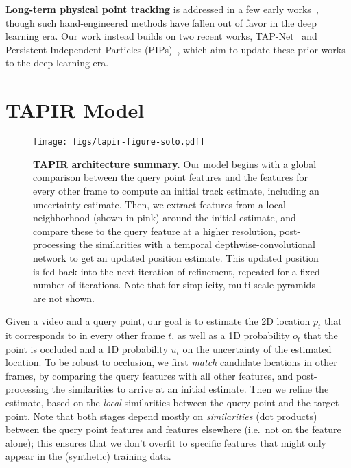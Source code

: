 \documentclass[10pt,twocolumn,letterpaper]{article}
\begin{document}
\noindent \textbf{Long-term physical point tracking} is addressed in a few early works~\cite{wang2013action,sand2008particle,liu2010sift,Rubinstein2012,Sivic2006}, though such hand-engineered methods have fallen out of favor in the deep learning era. 
Our work instead builds on two recent works, TAP-Net~\cite{doersch2022tap} and Persistent Independent Particles (PIPs)~\cite{harley2022particle}, which aim to update these prior works to the deep learning era.

\section{TAPIR Model}

\begin{figure}[t]
\begin{center}
\texttt{[image: figs/tapir-figure-solo.pdf]}
\end{center}
   \caption{\textbf{TAPIR architecture summary.}  Our model begins with a global comparison between the query point features and the features for every other frame to compute an initial track estimate, including an uncertainty estimate.  Then, we extract features from a local neighborhood (shown in pink) around the initial estimate, and compare these to the query feature at a higher resolution, post-processing the similarities with a temporal depthwise-convolutional network to get an updated position estimate.  This updated position is fed back into the next iteration of refinement, repeated for a fixed number of iterations.  Note that for simplicity, multi-scale pyramids are not shown.}
\label{fig:arch}
\end{figure}



Given a video and a query point, our goal is to estimate the 2D location  $p_t$ that it corresponds to in every other frame $t$, as well as a 1D probability $o_t$ that the point is occluded and a 1D probability $u_t$ on the uncertainty of the estimated location.
To be robust to occlusion, we first \textit{match} candidate locations in other frames, by comparing the query features with all other features, and post-processing the similarities to arrive at an initial estimate.  Then we refine the estimate, based on the \textit{local} similarities between the query point and the target point.  Note that both stages depend mostly on {\em similarities} (dot products) between the query point features and features elsewhere (i.e.\ not on the feature alone); this ensures that we don't overfit to specific features that might only appear in the (synthetic) training data.
\end{document}
